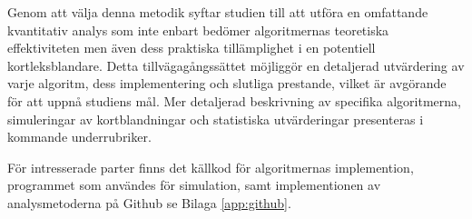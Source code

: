 \documentclass[swedish,a4paper]{article}
\begin{document}
Genom att välja denna metodik syftar studien till att utföra en omfattande
kvantitativ analys som inte enbart bedömer algoritmernas teoretiska
effektiviteten men även dess praktiska tillämplighet i en potentiell kortleks\-blandare.
Detta tillvägagångssättet möjliggör en detaljerad utvärdering av varje algoritm,
dess implementering och slutliga prestande, vilket är avgörande för att uppnå
studiens mål. Mer detaljerad beskrivning av specifika algoritmerna,
simuleringar av kortblandningar och statistiska utvärderingar presenteras i kommande 
underrubriker. 

För intresserade parter finns det källkod för algoritmernas implemention,
programmet som användes för simulation, samt implementionen av analysmetoderna
på Github se Bilaga \ref{app:github}.

%
%
\end{document}
